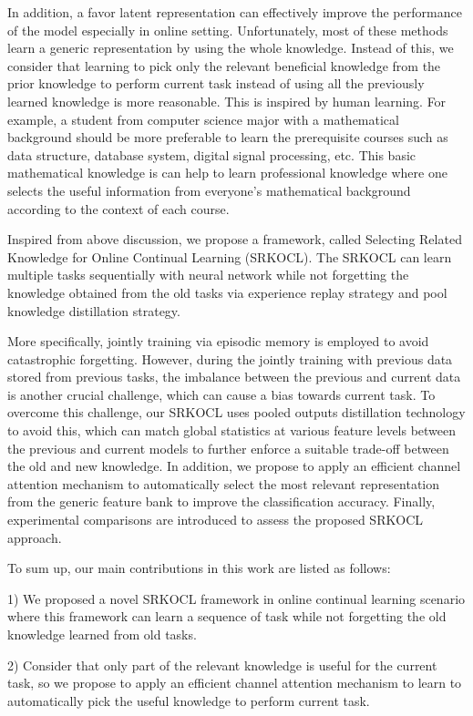 \documentclass[review]{elsarticle}
\begin{document}
In addition, a favor latent representation can effectively improve the performance of the model especially in online setting. Unfortunately, most of these methods learn a generic representation by using the whole knowledge. Instead of this, we consider that learning to pick only the relevant beneficial knowledge from the prior knowledge to perform current task instead of using all the previously learned knowledge is more reasonable. This is inspired by human learning. For example, a student from computer science major with a mathematical background should be more preferable to learn the prerequisite courses such as data structure, database system, digital signal processing, etc. This basic mathematical knowledge is can help to learn professional knowledge where one selects the useful information from everyone’s mathematical background according to the context of each course. 

Inspired from above discussion, we propose a framework, called Selecting Related Knowledge for Online Continual Learning (SRKOCL). The SRKOCL can learn multiple tasks sequentially with neural network while not forgetting the knowledge obtained from the old tasks via experience replay strategy and pool knowledge distillation strategy. 

More specifically, jointly training via episodic memory is employed to avoid catastrophic forgetting. However, during the jointly training with previous data stored from previous tasks, the imbalance between the previous and current data is another crucial challenge, which can cause a bias towards current task. To overcome this challenge, our SRKOCL uses pooled outputs distillation \cite{10douillard2020podnet} technology to avoid this, which can match global statistics at various feature levels between the previous and current models to further enforce a suitable trade-off between the old and new knowledge. In addition, we propose to apply an efficient channel attention mechanism to automatically select the most relevant representation from the generic feature bank to improve the classification accuracy. Finally, experimental comparisons are introduced to assess the proposed SRKOCL approach. 

To sum up, our main contributions in this work are listed as follows:

1) We proposed a novel SRKOCL framework in online continual learning scenario where this framework can learn a sequence of task while not forgetting the old knowledge learned from old tasks.

2) Consider that only part of the relevant knowledge is useful for the current task, so we propose to apply an efficient channel attention mechanism to learn to automatically pick the useful knowledge to perform current task.
\end{document}
